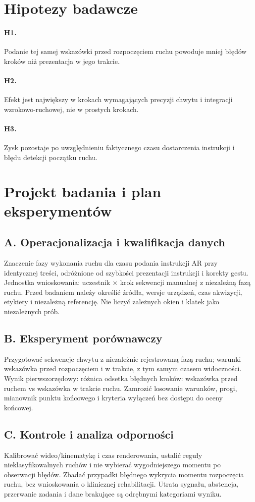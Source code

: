 \documentclass[11pt,a4paper]{article}
\begin{document}
\section{Hipotezy badawcze}
\paragraph{H1.} Podanie tej samej wskazówki przed rozpoczęciem ruchu powoduje mniej błędów kroków niż prezentacja w jego trakcie.
\paragraph{H2.} Efekt jest największy w krokach wymagających precyzji chwytu i integracji wzrokowo-ruchowej, nie w prostych krokach.
\paragraph{H3.} Zysk pozostaje po uwzględnieniu faktycznego czasu dostarczenia instrukcji i błędu detekcji początku ruchu.
\section{Projekt badania i plan eksperymentów}
\subsection{A. Operacjonalizacja i kwalifikacja danych}
Znaczenie fazy wykonania ruchu dla czasu podania instrukcji AR przy identycznej treści, odróżnione od szybkości prezentacji instrukcji i korekty gestu. Jednostka wnioskowania: uczestnik × krok sekwencji manualnej z niezależną fazą ruchu. Przed badaniem należy określić źródła, wersje urządzeń, czas akwizycji, etykiety i niezależną referencję. Nie liczyć zależnych okien i klatek jako niezależnych prób.
\subsection{B. Eksperyment porównawczy}
Przygotować sekwencje chwytu z niezależnie rejestrowaną fazą ruchu; warunki wskazówka przed rozpoczęciem i w trakcie, z tym samym czasem widoczności. Wynik pierwszorzędowy: różnica odsetka błędnych kroków: wskazówka przed ruchem vs wskazówka w trakcie ruchu. Zamrozić losowanie warunków, progi, mianownik punktu końcowego i kryteria wyłączeń bez dostępu do oceny końcowej.
\subsection{C. Kontrole i analiza odporności}
Kalibrować wideo/kinematykę i czas renderowania, ustalić reguły nieklasyfikowalnych ruchów i nie wybierać wygodniejszego momentu po obserwacji błędów. Zbadać przypadki błędnego wykrycia momentu rozpoczęcia ruchu, bez wnioskowania o klinicznej rehabilitacji. Utrata sygnału, abstencja, przerwanie zadania i dane brakujące są odrębnymi kategoriami wyniku.
\end{document}
